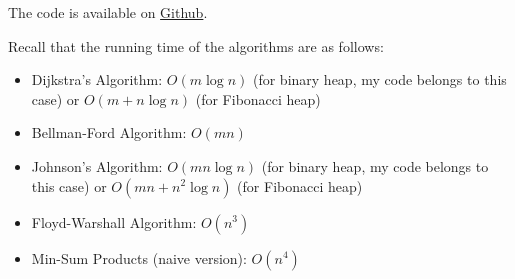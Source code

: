 \documentclass[11pt]{article}
\theoremstyle{plain}
\begin{document}
The code is available on \href{https://github.com/Integer003/AlgorithmDesign-project}{Github}.

Recall that the running time of the algorithms are as follows:
\begin{itemize}
  \item Dijkstra's Algorithm: $O(m \log n)$ (for binary heap, my code belongs to this case) or $O(m + n \log n)$ (for Fibonacci heap)
  \item Bellman-Ford Algorithm: $O(mn)$
  \item Johnson's Algorithm: $O(mn \log n)$ (for binary heap, my code belongs to this case) or $O(mn + n^2 \log n)$ (for Fibonacci heap)
  \item Floyd-Warshall Algorithm: $O(n^3)$
  \item Min-Sum Products (naive version): $O(n^4)$
\end{itemize}


\end{document}
